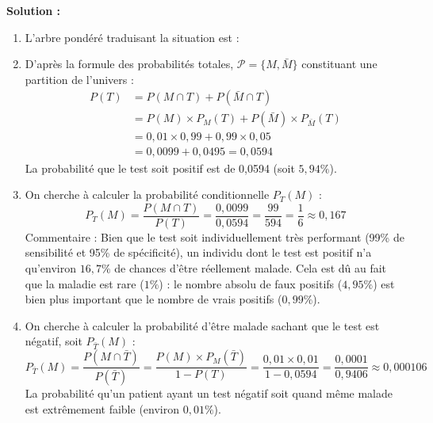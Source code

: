 \textbf{Solution :}
\begin{enumerate}
    \item L'arbre pondéré traduisant la situation est :
    \begin{center}
    \end{center}
    
    \item D'après la formule des probabilités totales, $\mathcal{P} = \{M, \bar{M}\}$ constituant une partition de l'univers :
    \[
    \begin{aligned}
    P(T) &= P(M \cap T) + P(\bar{M} \cap T) \\
    &= P(M) \times P_M(T) + P(\bar{M}) \times P_{\bar{M}}(T) \\
    &= 0,01 \times 0,99 + 0,99 \times 0,05 \\
    &= 0,0099 + 0,0495 = 0,0594
    \end{aligned}
    \]
    La probabilité que le test soit positif est de 0,0594 (soit $5,94\%$).
    
    \item On cherche à calculer la probabilité conditionnelle $P_T(M)$ :
    \[
    P_T(M) = \frac{P(M \cap T)}{P(T)} = \frac{0,0099}{0,0594} = \frac{99}{594} = \frac{1}{6} \approx 0,167
    \]
    Commentaire : Bien que le test soit individuellement très performant (99\% de sensibilité et 95\% de spécificité), un individu dont le test est positif n'a qu'environ $16,7\%$ de chances d'être réellement malade. Cela est dû au fait que la maladie est rare ($1\%$) : le nombre absolu de faux positifs ($4,95\%$) est bien plus important que le nombre de vrais positifs ($0,99\%$).
    
    \item On cherche à calculer la probabilité d'être malade sachant que le test est négatif, soit $P_{\bar{T}}(M)$ :
    \[
    P_{\bar{T}}(M) = \frac{P(M \cap \bar{T})}{P(\bar{T})} = \frac{P(M) \times P_M(\bar{T})}{1 - P(T)} = \frac{0,01 \times 0,01}{1 - 0,0594} = \frac{0,0001}{0,9406} \approx 0,000106
    \]
    La probabilité qu'un patient ayant un test négatif soit quand même malade est extrêmement faible (environ $0,01\%$).
\end{enumerate}

